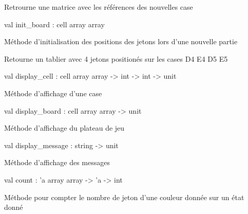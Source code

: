 \documentclass[11pt]{article}
\begin{document}
Retrourne une matrice avec les références des nouvelles case



\label{val:Othello.init-underscoreboard}\begin{ocamldoccode}
val init_board : cell array array
\end{ocamldoccode}
\begin{ocamldocdescription}
Méthode d'initialisation des positions des jetons lors d'une nouvelle partie


\end{ocamldocdescription}




Retourne un tablier avec 4 jetons positionés sur les cases D4 E4 D5 E5



\label{val:Othello.display-underscorecell}\begin{ocamldoccode}
val display_cell : cell array array -> int -> int -> unit
\end{ocamldoccode}
\begin{ocamldocdescription}
Méthode d'affichage d'une case


\end{ocamldocdescription}




\label{val:Othello.display-underscoreboard}\begin{ocamldoccode}
val display_board : cell array array -> unit
\end{ocamldoccode}
\begin{ocamldocdescription}
Méthode d'affichage du plateau de jeu


\end{ocamldocdescription}




\label{val:Othello.display-underscoremessage}\begin{ocamldoccode}
val display_message : string -> unit
\end{ocamldoccode}
\begin{ocamldocdescription}
Méthode d'affichage des messages


\end{ocamldocdescription}




\label{val:Othello.count}\begin{ocamldoccode}
val count : 'a array array -> 'a -> int
\end{ocamldoccode}
\begin{ocamldocdescription}
Méthode pour compter le nombre de jeton d'une couleur donnée sur un état donné


\end{ocamldocdescription}
\end{document}
